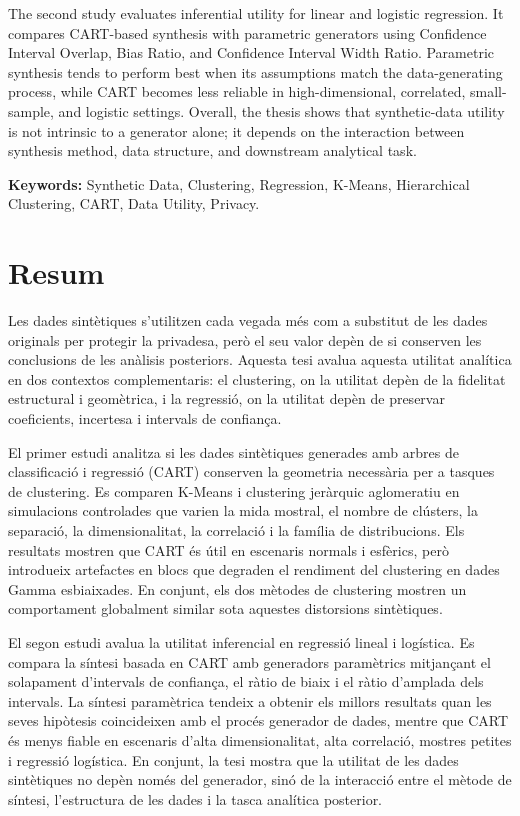 \documentclass[12pt, a4paper, twoside]{report}
\begin{document}
The second study evaluates inferential utility for linear and logistic regression. It compares CART-based synthesis with parametric generators using Confidence Interval Overlap, Bias Ratio, and Confidence Interval Width Ratio. Parametric synthesis tends to perform best when its assumptions match the data-generating process, while CART becomes less reliable in high-dimensional, correlated, small-sample, and logistic settings. Overall, the thesis shows that synthetic-data utility is not intrinsic to a generator alone; it depends on the interaction between synthesis method, data structure, and downstream analytical task.

\vspace{0.5cm}
\noindent\textbf{Keywords:} Synthetic Data, Clustering, Regression, K-Means, Hierarchical Clustering, CART, Data Utility, Privacy.

\newpage

\chapter*{Resum}
Les dades sint\`etiques s'utilitzen cada vegada m\'es com a substitut de les dades originals per protegir la privadesa, per\`o el seu valor dep\`en de si conserven les conclusions de les an\`alisis posteriors. Aquesta tesi avalua aquesta utilitat anal\'itica en dos contextos complementaris: el clustering, on la utilitat dep\`en de la fidelitat estructural i geom\`etrica, i la regressi\'o, on la utilitat dep\`en de preservar coeficients, incertesa i intervals de confian\c{c}a.

El primer estudi analitza si les dades sint\`etiques generades amb arbres de classificaci\'o i regressi\'o (CART) conserven la geometria necess\`aria per a tasques de clustering. Es comparen K-Means i clustering jer\`arquic aglomeratiu en simulacions controlades que varien la mida mostral, el nombre de cl\'usters, la separaci\'o, la dimensionalitat, la correlaci\'o i la fam\'ilia de distribucions. Els resultats mostren que CART \'es \'util en escenaris normals i esf\`erics, per\`o introdueix artefactes en blocs que degraden el rendiment del clustering en dades Gamma esbiaixades. En conjunt, els dos m\`etodes de clustering mostren un comportament globalment similar sota aquestes distorsions sint\`etiques.

El segon estudi avalua la utilitat inferencial en regressi\'o lineal i log\'istica. Es compara la s\'intesi basada en CART amb generadors param\`etrics mitjan\c{c}ant el solapament d'intervals de confian\c{c}a, el r\`atio de biaix i el r\`atio d'amplada dels intervals. La s\'intesi param\`etrica tendeix a obtenir els millors resultats quan les seves hip\`otesis coincideixen amb el proc\'es generador de dades, mentre que CART \'es menys fiable en escenaris d'alta dimensionalitat, alta correlaci\'o, mostres petites i regressi\'o log\'istica. En conjunt, la tesi mostra que la utilitat de les dades sint\`etiques no dep\`en nom\'es del generador, sin\'o de la interacci\'o entre el m\`etode de s\'intesi, l'estructura de les dades i la tasca anal\'itica posterior.
\end{document}
